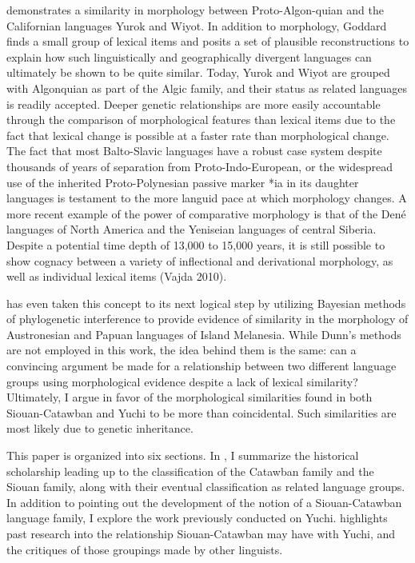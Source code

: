 \documentclass[output=paper]{LSP/langsci}
\begin{document}
\citet{Goddard1975} demonstrates a similarity in morphology between Proto-Algon-quian and the Californian languages Yurok and Wiyot. In addition to morphology, Goddard finds a small group of lexical items and posits a set of plausible reconstructions to explain how such linguistically and geographically divergent languages can ultimately be shown to be quite similar. Today, Yurok and Wiyot are grouped with Algonquian as part of the Algic family, and their status as related languages is readily accepted. Deeper genetic relationships are more easily accountable through the comparison of morphological features than lexical items due to the fact that lexical change is possible at a faster rate than morphological change. The fact that most Balto-Slavic languages have a robust case system despite thousands of years of separation from Proto-Indo-European, or the widespread use of the inherited Proto-Polynesian passive marker *ia in its daughter languages is testament to the more languid pace at which morphology changes. A more recent example of the power of comparative morphology is that of the Den\'e languages of North America and the Yeniseian languages of central Siberia. Despite a potential time depth of 13,000 to 15,000 years, it is still possible to show cognacy between a variety of inflectional and derivational morphology, as well as individual lexical items (Vajda 2010).

\citet{Dunn2009} has even taken this concept to its next logical step by utilizing Bayesian methods of phylogenetic interference to provide evidence of similarity in the morphology of Austronesian and Papuan languages of Island Melanesia. While Dunn's methods are not employed in this work, the idea behind them is the same: can a convincing argument be made for a relationship between two different language groups using morphological evidence despite a lack of lexical similarity? Ultimately, I argue in favor of the morphological similarities found in both Siouan-Catawban and Yuchi to be more than coincidental. Such similarities are most likely due to genetic inheritance.

This paper is organized into six sections. In , I summarize the historical scholarship leading up to the classification of the Catawban family and the Siouan family, along with their eventual classification as related language groups. In addition to pointing out the development of the notion of a Siouan-Catawban language family, I explore the work previously conducted on Yuchi.  highlights past research into the relationship Siouan-Catawban may have with Yuchi, and the critiques of those groupings made by other linguists. 
\end{document}
